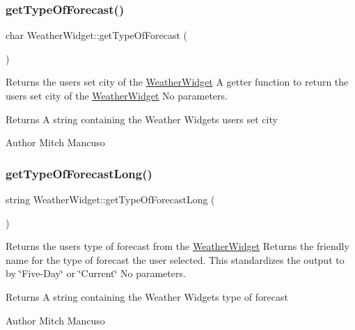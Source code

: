 \subsubsection{\texorpdfstring{get\+Type\+Of\+Forecast()}{getTypeOfForecast()}}
{\footnotesize\ttfamily char Weather\+Widget\+::get\+Type\+Of\+Forecast (\begin{DoxyParamCaption}{ }\end{DoxyParamCaption})}



Returns the user\textquotesingle{}s set city of the \mbox{\hyperlink{class_weather_widget}{Weather\+Widget}}  A getter function to return the user\textquotesingle{}s set city of the \mbox{\hyperlink{class_weather_widget}{Weather\+Widget}}  No parameters. 

\begin{DoxyReturn}{Returns}
A string containing the Weather Widget\textquotesingle{}s user\textquotesingle{}s set city 
\end{DoxyReturn}
\begin{DoxyAuthor}{Author}
Mitch Mancuso 
\end{DoxyAuthor}
\mbox{\label{class_weather_widget_aeb1d38f52ab208d41c1cd52a09780f75}} 
\subsubsection{\texorpdfstring{get\+Type\+Of\+Forecast\+Long()}{getTypeOfForecastLong()}}
{\footnotesize\ttfamily string Weather\+Widget\+::get\+Type\+Of\+Forecast\+Long (\begin{DoxyParamCaption}{ }\end{DoxyParamCaption})}



Returns the user\textquotesingle{}s type of forecast from the \mbox{\hyperlink{class_weather_widget}{Weather\+Widget}}  Returns the friendly name for the type of forecast the user selected. This standardizes the output to by \char`\"{}\+Five-\/\+Day\char`\"{} or \char`\"{}\+Current\char`\"{}  No parameters. 

\begin{DoxyReturn}{Returns}
A string containing the Weather Widget\textquotesingle{}s type of forecast 
\end{DoxyReturn}
\begin{DoxyAuthor}{Author}
Mitch Mancuso 
\end{DoxyAuthor}
\mbox{\label{class_weather_widget_ac46edf497f42b64982707a3886b28b4d}} 
